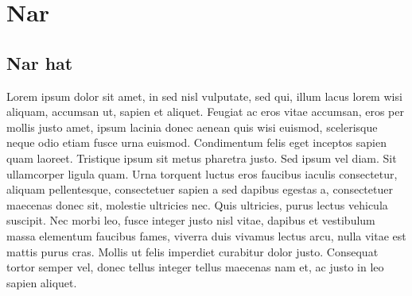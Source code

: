 \chapter{Nar}
\section{Nar hat }
Lorem ipsum dolor sit amet, in sed nisl vulputate, sed qui, illum lacus lorem wisi aliquam, accumsan ut, sapien et aliquet. Feugiat ac eros vitae accumsan, eros per mollis justo amet, ipsum lacinia donec aenean quis wisi euismod, scelerisque neque odio etiam fusce urna euismod. Condimentum felis eget inceptos sapien quam laoreet. Tristique ipsum sit metus pharetra justo. Sed ipsum vel diam. Sit ullamcorper ligula quam. Urna torquent luctus eros faucibus iaculis consectetur, aliquam pellentesque, consectetuer sapien a sed dapibus egestas a, consectetuer maecenas donec sit, molestie ultricies nec. Quis ultricies, purus lectus vehicula suscipit. Nec morbi leo, fusce integer justo nisl vitae, dapibus et vestibulum massa elementum faucibus fames, viverra duis vivamus lectus arcu, nulla vitae est mattis purus cras. Mollis ut felis imperdiet curabitur dolor justo. Consequat tortor semper vel, donec tellus integer tellus maecenas nam et, ac justo in leo sapien aliquet.
